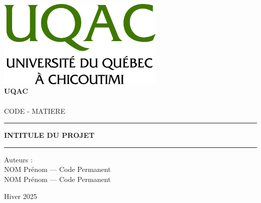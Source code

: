 \begin{center}
    \includegraphics[width=0.6\textwidth]{img/logo/UQAC}
    \Huge
    \vspace{2cm}
    \textbf{\\\vspace{0.4cm}UQAC\\}
    \vspace{0.75cm}
    \\CODE - MATIERE

    \vspace{1.0cm}
    \color{polytech}\rule{\textwidth}{1pt}
    \begin{center}
        \vspace{0.3cm}
        \Huge
        \color{black}\textbf{INTITULE DU PROJET}   
    \end{center}
    \rule{\textwidth}{1pt}

    \vspace{1.5cm}
    \color{black}\Large 
    Auteurs :\\
    NOM Prénom — Code Permanent\\
    NOM Prénom — Code Permanent\\
    \vspace{0.5cm}
        
    \vfill
    \Large
    Hiver 2025
            
\end{center}
\newpage
\begingroup
    \renewcommand{\contentsname}{Sommaire}
    \tableofcontents
    \renewcommand{\listfigurename}{Table des Figures}
    \listoffigures
\endgroup
\newpage